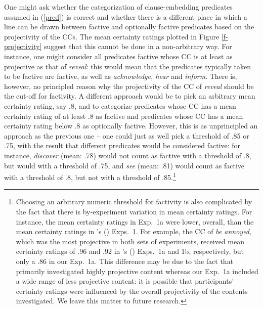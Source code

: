 \documentclass[11pt,fleqn]{article}
\newcommand{\6}{\mbox{$[\hspace*{-.6mm}[$}}
\newcommand{\9}{\mbox{$]\hspace*{-.6mm}]$}}
\newcommand{\citetpos}[1]{\citeauthor{#1}'s (\citeyear{#1})}
\begin{document}
One might ask whether the categorization of clause-embedding predicates assumed in (\ref{pred}) is correct and whether there is a different place in which a line can be drawn between factive and optionally factive predicates based on the projectivity of the CCs. The mean certainty ratings plotted in Figure \ref{f-projectivity} suggest that this cannot be done in a non-arbitrary way. For instance, one might consider all predicates factive whose CC is at least as projective as that of {\em reveal}: this would mean that the predicates typically taken to be factive are factive, as well as {\em acknowledge, hear} and {\em inform}. There is, however, no principled reason why the projectivity of the CC of {\em reveal} should be the cut-off for factivity. A different approach would be to pick an arbitrary mean certainty rating, say .8, and to categorize predicates whose CC has a mean certainty rating of at least .8 as factive and predicates whose CC has a mean certainty rating below .8 as optionally factive. However, this is as unprincipled an approach as the previous one -- one could just as well pick a threshold of .85 or .75, with the result that different predicates would be considered factive: for instance, {\em discover} (mean: .78) would not count as factive with a threshold of .8, but would with a threshold of .75, and {\em see} (mean: .81) would count as factive with a threshold of .8, but not with a threshold of .85.\footnote{Choosing an arbitrary numeric threshold for factivity is also complicated by the fact that there is by-experiment variation in mean certainty ratings. For instance, the mean certainty ratings in Exp.~1a were lower, overall, than the mean certainty ratings in \citetpos{tbd-variability} Exps.~1. For example, the CC of {\em be annoyed}, which was the most projective in both sets of experiments, received mean certainty ratings of .96  and .92 in \citetpos{tbd-variability} Exps.~1a and 1b, respectively, but only a .86 in our Exp.~1a. This difference may be due to the fact that \citet{tbd-variability} primarily investigated highly projective content whereas our Exp.~1a included a wide range of less projective content: it is possible that participants' certainty ratings were influenced by the overall projectivity of the contents investigated. We leave this matter to future research.}
\end{document}
